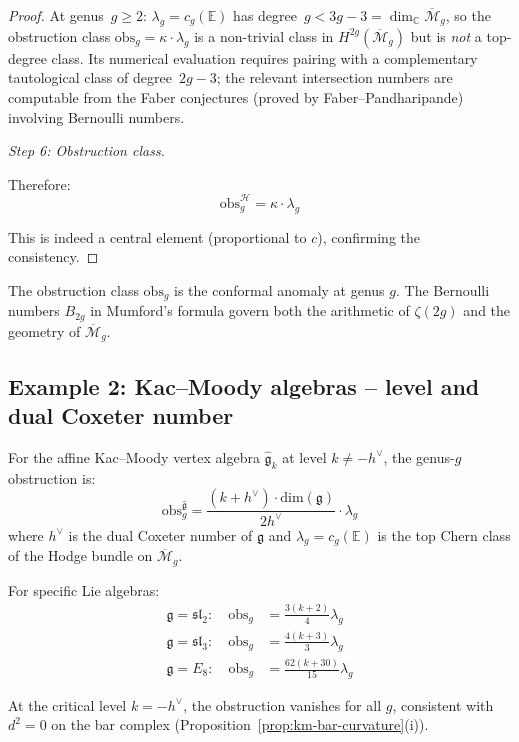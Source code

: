 \begin{proof}
At genus~$g \geq 2$: $\lambda_g = c_g(\mathbb{E})$ has degree~$g < 3g{-}3 = \dim_{\mathbb{C}}\overline{\mathcal{M}}_g$, so the obstruction class $\mathrm{obs}_g = \kappa \cdot \lambda_g$ is a non-trivial class in $H^{2g}(\overline{\mathcal{M}}_g)$ but is \emph{not} a top-degree class.  Its numerical evaluation requires pairing with a complementary tautological class of degree~$2g{-}3$; the relevant intersection numbers are computable from the Faber conjectures (proved by Faber--Pandharipande) involving Bernoulli numbers.

\emph{Step 6: Obstruction class.}

Therefore:
\[\text{obs}_g^{\mathcal{H}} = \kappa \cdot \lambda_g\]

This is indeed a central element (proportional to $c$), confirming the consistency.
\end{proof}

\begin{remark}\label{rem:heisenberg-anomaly}
The obstruction class $\text{obs}_g$ is the conformal anomaly at genus $g$.  The Bernoulli numbers $B_{2g}$ in Mumford's formula govern both the arithmetic of $\zeta(2g)$ and the geometry of $\overline{\mathcal{M}}_g$.
\end{remark}

\subsection{Example 2: Kac--Moody algebras -- level and dual Coxeter number}
\label{subsec:kac-moody-obstruction}

\begin{theorem}\label{thm:kac-moody-obs}
For the affine Kac--Moody vertex algebra $\widehat{\mathfrak{g}}_k$ at level $k \neq -h^\vee$,
the genus-$g$ obstruction is:
\begin{equation}
\text{obs}_g^{\widehat{\mathfrak{g}}} = \frac{(k + h^\vee) \cdot
\text{dim}(\mathfrak{g})}{2h^\vee} \cdot \lambda_g
\end{equation}
where $h^\vee$ is the dual Coxeter number of $\mathfrak{g}$ and $\lambda_g = c_g(\mathbb{E})$
is the top Chern class of the Hodge bundle on $\overline{\mathcal{M}}_g$.

For specific Lie algebras:
\begin{align}
\mathfrak{g} = \mathfrak{sl}_2: \quad \text{obs}_g &= \frac{3(k+2)}{4} \lambda_g \\
\mathfrak{g} = \mathfrak{sl}_3: \quad \text{obs}_g &= \frac{4(k+3)}{3} \lambda_g \\
\mathfrak{g} = E_8: \quad \text{obs}_g &= \frac{62(k+30)}{15} \lambda_g
\end{align}

At the critical level $k = -h^\vee$, the obstruction vanishes for all $g$, consistent with
$d^2 = 0$ on the bar complex (Proposition~\ref{prop:km-bar-curvature}(i)).
\end{theorem}


